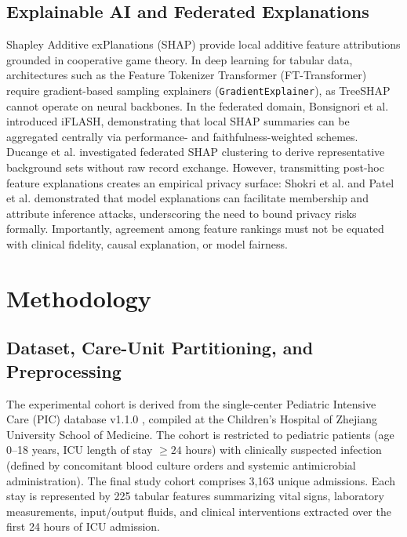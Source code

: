 \documentclass[runningheads]{llncs}
\begin{document}
\subsection{Explainable AI and Federated Explanations}
Shapley Additive exPlanations (SHAP) \cite{lundberg2017shap} provide local additive feature attributions grounded in cooperative game theory. In deep learning for tabular data, architectures such as the Feature Tokenizer Transformer (FT-Transformer) \cite{gorishniy2021revisiting} require gradient-based sampling explainers (\texttt{GradientExplainer}), as TreeSHAP cannot operate on neural backbones. In the federated domain, Bonsignori et al. \cite{bonsignori2026interpreting} introduced iFLASH, demonstrating that local SHAP summaries can be aggregated centrally via performance- and faithfulness-weighted schemes. Ducange et al. \cite{ducange2026federated} investigated federated SHAP clustering to derive representative background sets without raw record exchange. However, transmitting post-hoc feature explanations creates an empirical privacy surface: Shokri et al. \cite{shokri2021privacy} and Patel et al. \cite{patel2022model} demonstrated that model explanations can facilitate membership and attribute inference attacks, underscoring the need to bound privacy risks formally. Importantly, agreement among feature rankings must not be equated with clinical fidelity, causal explanation, or model fairness.

\section{Methodology}\label{sec:method}

\subsection{Dataset, Care-Unit Partitioning, and Preprocessing}
The experimental cohort is derived from the single-center Pediatric Intensive Care (PIC) database v1.1.0 \cite{zeng2020pic}, compiled at the Children's Hospital of Zhejiang University School of Medicine. The cohort is restricted to pediatric patients (age 0--18 years, ICU length of stay $\ge 24$ hours) with clinically suspected infection (defined by concomitant blood culture orders and systemic antimicrobial administration). The final study cohort comprises 3,163 unique admissions. Each stay is represented by 225 tabular features summarizing vital signs, laboratory measurements, input/output fluids, and clinical interventions extracted over the first 24 hours of ICU admission.
\end{document}
